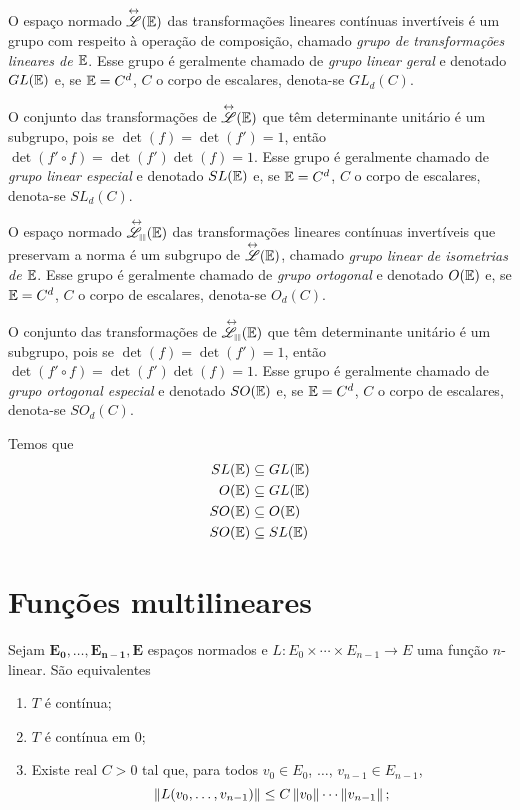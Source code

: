 O espaço normado $\overset{\leftrightarrow}{\mathscr{L}}(\mathbb{E})$ das transformações lineares contínuas invertíveis é um grupo com respeito à operação de composição, chamado \emph{grupo de transformações lineares de $\mathbb{E}$}. Esse grupo é geralmente chamado de \emph{grupo linear geral} e denotado $GL(\mathbb{E})$ e, se $\mathbb{E}=C^d$, $C$ o corpo de escalares, denota-se $GL_d(C)$.

O conjunto das transformações de $\overset{\leftrightarrow}{\mathscr{L}}(\mathbb{E})$ que têm determinante unitário é um subgrupo, pois se $\det(f)=\det(f')=1$, então $\det(f' \circ f)=\det(f')\det(f)=1$. Esse grupo é geralmente chamado de \emph{grupo linear especial} e denotado $SL(\mathbb{E})$ e, se $\mathbb{E}=C^d$, $C$ o corpo de escalares, denota-se $SL_d(C)$.

O espaço normado $\Iso{\Linmet}(\E)$ das transformações lineares contínuas invertíveis que preservam a norma é um subgrupo de $\overset{\leftrightarrow}{\mathscr{L}}(\mathbb{E})$, chamado \emph{grupo linear de isometrias de $\mathbb{E}$}. Esse grupo é geralmente chamado de \emph{grupo ortogonal} e denotado $O(\mathbb{E})$ e, se $\mathbb{E}=C^d$, $C$ o corpo de escalares, denota-se $O_d(C)$.

O conjunto das transformações de $\Iso{\Linmet}(\E)$ que têm determinante unitário é um subgrupo, pois se $\det(f)=\det(f')=1$, então $\det(f' \circ f)=\det(f')\det(f)=1$. Esse grupo é geralmente chamado de \emph{grupo ortogonal especial} e denotado $SO(\mathbb{E})$ e, se $\mathbb{E}=C^d$, $C$ o corpo de escalares, denota-se $SO_d(C)$.

Temos que
	\begin{align*}
	SL(\mathbb{E}) &\subseteq GL(\mathbb{E}) \\
	O(\mathbb{E}) &\subseteq GL(\mathbb{E}) \\
	SO(\mathbb{E}) &\subseteq O(\mathbb{E}) \\
	SO(\mathbb{E}) &\subseteq SL(\mathbb{E})
	\end{align*}

\section{Funções multilineares}

\begin{proposition}
Sejam $\bm{E_0},\dots,\bm{E_{n-1}},\bm{E}$ espaços normados e $L\colon E_0 \times \cdots \times E_{n-1} \to E$ uma função $n$-linear. São equivalentes
	\begin{enumerate}
	\item $T$ é contínua;
	\item $T$ é contínua em $0$;
	\item Existe real $C>0$ tal que, para todos $v_0 \in E_0$, $\ldots$, $v_{n-1} \in E_{n-1}$,
		\begin{equation*}
		\left\Vert{L(v_0,\dots,v_{n-1})}\right\Vert \leq C\left\Vert{v_0}\right\Vert\cdots\left\Vert{v_{n-1}}\right\Vert;
		\end{equation*}	
	\end{enumerate}
\end{proposition}

